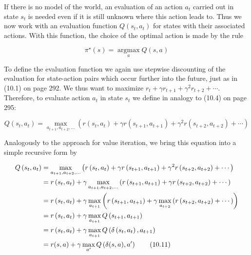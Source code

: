 \documentclass[10pt]{book}
\begin{document}
If there is no model of the world, an evaluation of an action $a_{t}$ carried out in state $s_{t}$ is needed even if it is still unknown where this action leads to. Thus we now work with an evaluation function $Q\left(s_{t}, a_{t}\right)$ for states with their associated actions. With this function, the choice of the optimal action is made by the rule


\begin{equation*}
\pi^{\star}(s)=\underset{a}{\operatorname{argmax}} Q(s, a) \tag{10.9}
\end{equation*}


To define the evaluation function we again use stepwise discounting of the evaluation for state-action pairs which occur further into the future, just as in (10.1) on page 292. We thus want to maximize $r_{t}+\gamma r_{t+1}+\gamma^{2} r_{t+2}+\cdots$. Therefore, to evaluate action $a_{t}$ in state $s_{t}$ we define in analogy to (10.4) on page 295:


\begin{equation*}
Q\left(s_{t}, a_{t}\right)=\max _{a_{t+1}, a_{t+2}, \ldots}\left(r\left(s_{t}, a_{t}\right)+\gamma r\left(s_{t+1}, a_{t+1}\right)+\gamma^{2} r\left(s_{t+2}, a_{t+2}\right)+\cdots\right) \tag{10.10}
\end{equation*}


Analogously to the approach for value iteration, we bring this equation into a simple recursive form by


\begin{align*}
Q\left(s_{t}, a_{t}\right) & =\max _{a_{t+1}, a_{t+2}, \ldots}\left(r\left(s_{t}, a_{t}\right)+\gamma r\left(s_{t+1}, a_{t+1}\right)+\gamma^{2} r\left(s_{t+2}, a_{t+2}\right)+\cdots\right) \\
& =r\left(s_{t}, a_{t}\right)+\gamma \max _{a_{t+1}, a_{t+2}, \ldots}\left(r\left(s_{t+1}, a_{t+1}\right)+\gamma r\left(s_{t+2}, a_{t+2}\right)+\cdots\right) \\
& =r\left(s_{t}, a_{t}\right)+\gamma \max _{a_{t+1}}\left(r\left(s_{t+1}, a_{t+1}\right)+\gamma \max _{a_{t+2}}\left(r\left(s_{t+2}, a_{t+2}\right)+\cdots\right)\right) \\\index{Q-learning!convergence}\index{Transition function}
& =r\left(s_{t}, a_{t}\right)+\gamma \max _{a_{t+1}} Q\left(s_{t+1}, a_{t+1}\right) \\
& =r\left(s_{t}, a_{t}\right)+\gamma \max _{a_{t+1}} Q\left(\delta\left(s_{t}, a_{t}\right), a_{t+1}\right) \\
& =r(s, a)+\gamma \max _{a^{\prime}} Q\left(\delta(s, a), a^{\prime}\right) \tag{10.11}
\end{align*}
\end{document}
